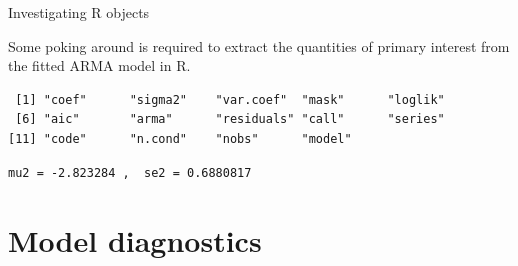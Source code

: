 \begin{frame}[fragile]{Investigating R objects}
 
Some poking around is required to extract the quantities of primary interest from the fitted ARMA model in R. 

\begin{knitrout}\small
{}\color{fgcolor}\begin{kframe}
\begin{alltt}
\end{alltt}
\begin{verbatim}
 [1] "coef"      "sigma2"    "var.coef"  "mask"      "loglik"   
 [6] "aic"       "arma"      "residuals" "call"      "series"   
[11] "code"      "n.cond"    "nobs"      "model"    
\end{verbatim}
\end{kframe}
\end{knitrout}

\begin{knitrout}\small
{}\color{fgcolor}\begin{kframe}
\begin{alltt}
 \hlkwb{<-} \hlopt{$}\hlstd{coef[}\hlstd{]}
 \hlkwb{<-} \hlopt{$}\hlstd{var.coef[}\hlstd{,}\hlstd{])}
\hlstd{(}  \hlstd{)}
\end{alltt}
\begin{verbatim}
mu2 = -2.823284 ,  se2 = 0.6880817 
\end{verbatim}
\end{kframe}
\end{knitrout}

\end{frame}

\section{Model diagnostics}

